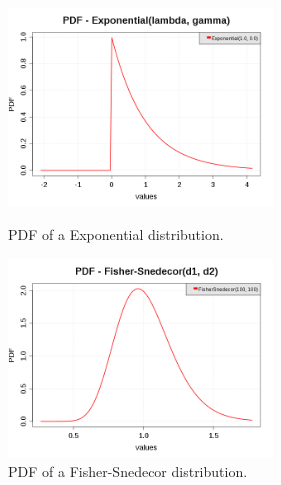 \begin{figure}[H]
  \begin{minipage}{10cm}
    \begin{center}
      \includegraphics[width=7cm]{pdf_Exponential.png}
      \caption{PDF of a Exponential distribution.}
      \label{PDFExponential}
    \end{center}
  \end{minipage}
  \hfill
  \begin{minipage}{10cm}
    \begin{center}
      \includegraphics[width=7cm]{pdf_FisherSnedecor_1.png}
      \caption{PDF of a Fisher-Snedecor distribution.}
      \label{PDFFisherSnedecor1}
    \end{center}
  \end{minipage}
\end{figure}



